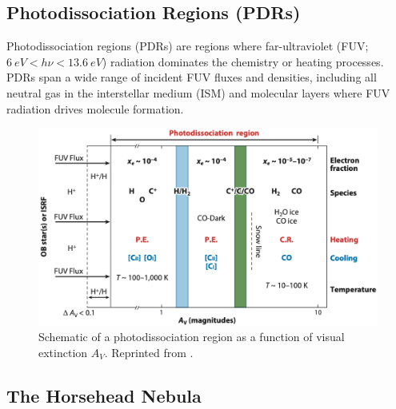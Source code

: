 \documentclass[12pt,a4paper]{article}
\begin{document}
\subsection{Photodissociation Regions (PDRs)}
Photodissociation regions (PDRs) are regions where far-ultraviolet (FUV; $\qty{6}{eV} < h\nu < \qty{13.6}{eV}$) radiation dominates the chemistry or heating processes\parencite{Tielens1985}. PDRs span a wide range of incident FUV fluxes and densities, including all neutral gas in the interstellar medium (ISM) and molecular layers where FUV radiation drives molecule formation.

\begin{figure}
    \centering
    \includegraphics[width=.7\textwidth,keepaspectratio]{figures/PDRScheme_Wolfire2022fig2.png}
    \caption{Schematic of a photodissociation region as a function of visual extinction $A_V$. Reprinted from \textcite{Wolfire2022}.}
\end{figure}
\subsection{The Horsehead Nebula}

\end{document}
